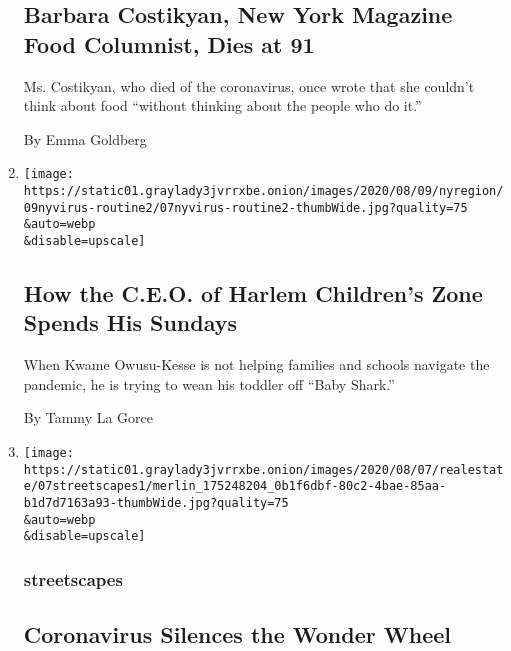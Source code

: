 \begin{enumerate}
  \hypertarget{barbara-costikyan-new-york-magazine-food-columnist-dies-at-91}{%
  \subsection{Barbara Costikyan, New York Magazine Food Columnist, Dies
  at
  91}\label{barbara-costikyan-new-york-magazine-food-columnist-dies-at-91}}

  Ms. Costikyan, who died of the coronavirus, once wrote that she
  couldn't think about food ``without thinking about the people who do
  it.''

  By Emma Goldberg
\item
  \href{/2020/08/07/nyregion/Kwame-Owusu-Kesse.html}{}

  \texttt{[image: https://static01.graylady3jvrrxbe.onion/images/2020/08/09/nyregion/09nyvirus-routine2/07nyvirus-routine2-thumbWide.jpg?quality=75\\\&auto=webp\\\&disable=upscale]}

  \hypertarget{how-the-ceo-of-harlem-childrens-zone-spends-his-sundays}{%
  \subsection{How the C.E.O. of Harlem Children's Zone Spends His
  Sundays}\label{how-the-ceo-of-harlem-childrens-zone-spends-his-sundays}}

  When Kwame Owusu-Kesse is not helping families and schools navigate
  the pandemic, he is trying to wean his toddler off ``Baby Shark.''

  By Tammy La Gorce
\item
  \href{/2020/08/07/realestate/coronavirus-coney-island-wonder-wheel.html}{}

  \texttt{[image: https://static01.graylady3jvrrxbe.onion/images/2020/08/07/realestate/07streetscapes1/merlin\_175248204\_0b1f6dbf-80c2-4bae-85aa-b1d7d7163a93-thumbWide.jpg?quality=75\\\&auto=webp\\\&disable=upscale]}

  \hypertarget{streetscapes}{%
  \subsubsection{streetscapes}\label{streetscapes}}

  \hypertarget{coronavirus-silences-the-wonder-wheel}{%
  \subsection{Coronavirus Silences the Wonder
  Wheel}\label{coronavirus-silences-the-wonder-wheel}}


\end{enumerate}
